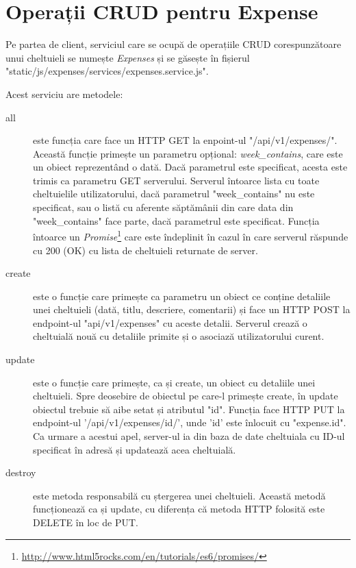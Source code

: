\section{Operații CRUD pentru Expense}

Pe partea de client, serviciul care se ocupă de operațiile
CRUD corespunzătoare unui cheltuieli se numește \emph{Expenses}
și se găsește în fișierul "static/js/expenses/services/expenses.service.js".



Acest serviciu are metodele:
\begin{description}
\item [all] este funcția care face un HTTP GET la enpoint-ul
"/api/v1/expenses/". Această funcție primește un parametru
opțional: \emph{week\_contains}, care este un obiect reprezentând
o dată. Dacă parametrul este specificat, acesta este trimis
ca parametru GET serverului. Serverul întoarce lista cu toate
cheltuielile utilizatorului, dacă parametrul "week\_contains"
nu este specificat, sau o listă cu aferente săptămânii
din care data din "week\_contains" face parte, dacă parametrul
este specificat. Funcția întoarce un 
\emph{Promise}\footnote{\url{http://www.html5rocks.com/en/tutorials/es6/promises/}}
care este îndeplinit în cazul în care serverul răspunde cu 200 (OK)
cu lista de cheltuieli returnate de server.
\item [create] este o funcție care primește ca parametru
un obiect ce conține detaliile unei cheltuieli (dată,
titlu, descriere, comentarii) și face un HTTP POST
la endpoint-ul "api/v1/expenses" cu aceste detalii.
Serverul crează o cheltuială nouă cu detaliile primite
și o asociază utilizatorului curent.
\item [update] este o funcție care primește, ca și create,
un obiect cu detaliile unei cheltuieli. Spre deosebire de
obiectul pe care-l primește create, în update obiectul
trebuie să aibe setat și atributul "id". Funcția face
HTTP PUT la endpoint-ul '/api/v1/expenses/{id}/',
unde '{id}' este înlocuit cu "expense.id". Ca urmare
a acestui apel, server-ul ia din baza de date 
cheltuiala cu ID-ul specificat în adresă și updatează
acea cheltuială.
\item [destroy] este metoda responsabilă cu ștergerea
unei cheltuieli. Această metodă funcționează ca și update,
cu diferența că metoda HTTP folosită este DELETE în loc
de PUT.
\end{description}

